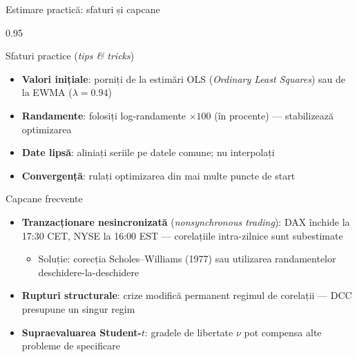 \documentclass[9pt, aspectratio=169, t]{beamer}
\begin{document}
\begin{frame}{Estimare practică: sfaturi și capcane}
    \begin{cminipage}{0.95\textwidth}
    {\footnotesize
    \begin{block}{Sfaturi practice (\textit{tips \& tricks})}
        \begin{itemize}\setlength{\itemsep}{0pt}
            \item \textbf{Valori inițiale}: porniți de la estimări OLS (\textit{Ordinary Least Squares}) sau de la EWMA ($\lambda = 0.94$)
            \item \textbf{Randamente}: folosiți log-randamente $\times 100$ (în procente) --- stabilizează optimizarea
            \item \textbf{Date lipsă}: aliniați seriile pe datele comune; nu interpolați
            \item \textbf{Convergență}: rulați optimizarea din mai multe puncte de start
        \end{itemize}
    \end{block}
    \begin{alertblock}{Capcane frecvente}
        \begin{itemize}\setlength{\itemsep}{0pt}
            \item \textbf{Tranzacționare nesincronizată} (\textit{nonsynchronous trading}): DAX închide la 17:30 CET, NYSE la 16:00 EST --- corelațiile intra-zilnice sunt subestimate
                \begin{itemize}\setlength{\itemsep}{0pt}
                    \item Soluție: corecția Scholes--Williams (1977) sau utilizarea randamentelor deschidere-la-deschidere
                \end{itemize}
            \item \textbf{Rupturi structurale}: crize modifică permanent regimul de corelații --- DCC presupune un singur regim
            \item \textbf{Supraevaluarea Student-$t$}: gradele de libertate $\nu$ pot compensa alte probleme de specificare
        \end{itemize}
    \end{alertblock}
    }
    \end{cminipage}
\end{frame}
\end{document}
